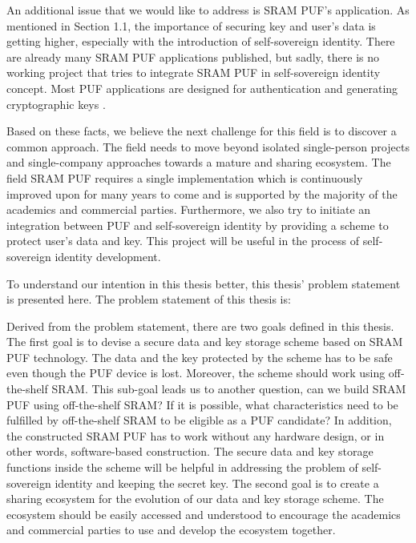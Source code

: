 An additional issue that we would like to address is SRAM PUF's application. As mentioned in Section 1.1, the importance of securing key and user's data is getting higher, especially with the introduction of self-sovereign identity. There are already many SRAM PUF applications published, but sadly, there is no working project that tries to integrate SRAM PUF in self-sovereign identity concept. Most PUF applications are designed for authentication \cite{Tuyls2007} \cite{delvaux} \cite{Suh:2007:PUF:1278480.1278484} \cite{10.1007/978-3-642-04474-8_22} \cite{10.1007/978-3-642-10838-9_22} \cite{10.1007/978-3-319-29078-2_5}
and generating cryptographic keys \cite{Suh:2007:PUF:1278480.1278484} \cite{10.1007/978-3-642-33027-8_18}.

Based on these facts, we believe the next challenge for this field is to discover a common approach. The field needs to move beyond isolated single-person projects and single-company approaches towards a mature and sharing ecosystem. The field SRAM PUF requires a single implementation which is continuously improved upon for many years to come and is supported by the majority of the academics and commercial parties.
Furthermore, we also try to initiate an integration between PUF and self-sovereign identity by providing a scheme to protect user's data and key. This project will be useful in the process of self-sovereign identity development.

To understand our intention in this thesis better, this thesis' problem statement is presented here. The problem statement of this thesis is:

\begin{adjustwidth}{1cm}{1cm}
		\textit{\problemStatement}
\end{adjustwidth}

Derived from the problem statement, there are two goals defined in this thesis. The first goal is to devise a secure data and key storage scheme based on SRAM PUF technology. The data and the key protected by the scheme has to be safe even though the PUF device is lost. Moreover, the scheme should work using off-the-shelf SRAM. This sub-goal leads us to another question, can we build SRAM PUF using off-the-shelf SRAM? If it is possible, what characteristics need to be fulfilled by off-the-shelf SRAM to be eligible as a PUF candidate?
In addition, the constructed SRAM PUF has to work without any hardware design, or in other words, software-based construction. The secure data and key storage functions inside the scheme will be helpful in addressing the problem of self-sovereign identity and keeping the secret key.
The second goal is to create a sharing ecosystem for the evolution of our data and key storage scheme. The ecosystem should be easily accessed and understood to encourage the academics and commercial parties to use and develop the ecosystem together.
